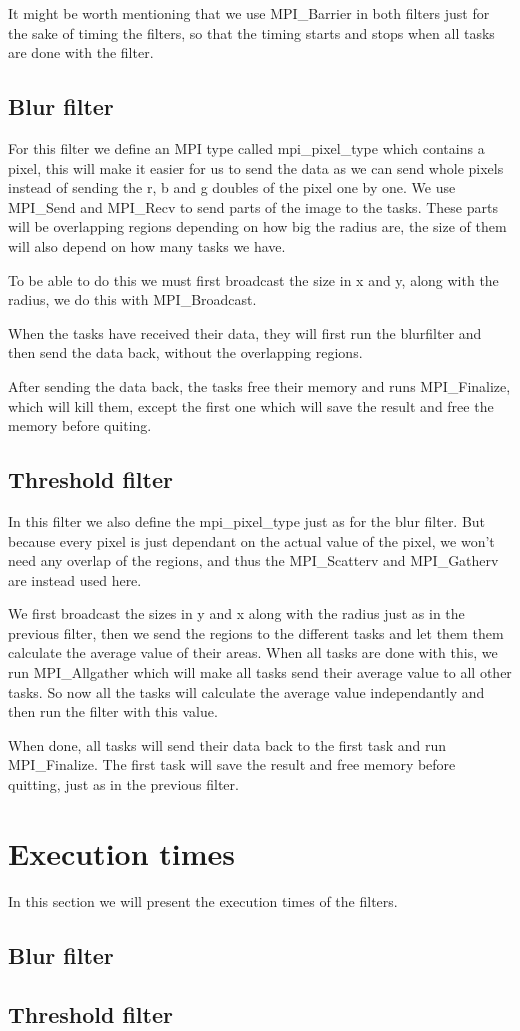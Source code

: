 \documentclass[titlepage, a4paper]{article}
\begin{document}
It might be worth mentioning that we use MPI\_Barrier in both filters just for the sake of timing the filters, so that the timing starts and stops when all tasks are done with the filter.

\subsection{Blur filter}
For this filter we define an MPI type called mpi\_pixel\_type which contains a pixel, this will make it easier for us to send the data as we can send whole pixels instead of sending the r, b and g doubles of the pixel one by one. We use MPI\_Send and MPI\_Recv to send parts of the image to the tasks. These parts will be overlapping regions depending on how big the radius are, the size of them will also depend on how many tasks we have.

To be able to do this we must first broadcast the size in x and y, along with the radius, we do this with MPI\_Broadcast.

When the tasks have received their data, they will first run the blurfilter and then send the data back, without the overlapping regions.

After sending the data back, the tasks free their memory and runs MPI\_Finalize, which will kill them, except the first one which will save the result and free the memory before quiting.

\subsection{Threshold filter}
In this filter we also define the mpi\_pixel\_type just as for the blur filter. But because every pixel is just dependant on the actual value of the pixel, we won't need any overlap of the regions, and thus the MPI\_Scatterv and MPI\_Gatherv are instead used here.

We first broadcast the sizes in y and x along with the radius just as in the previous filter, then we send the regions to the different tasks and let them them calculate the average value of their areas. When all tasks are done with this, we run MPI\_Allgather which will make all tasks send their average value to all other tasks. So now all the tasks will calculate the average value independantly and then run the filter with this value.

When done, all tasks will send their data back to the first task and run MPI\_Finalize. The first task will save the result and free memory before quitting, just as in the previous filter.

\section{Execution times}
In this section we will present the execution times of the filters.

\subsection{Blur filter}


\subsection{Threshold filter}
\end{document}
